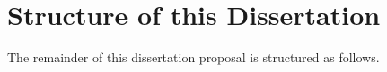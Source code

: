 \section{Structure of this Dissertation}

The remainder of this dissertation proposal is structured as follows. 

